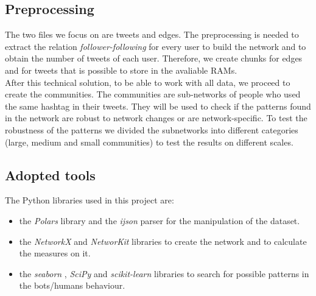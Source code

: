 \documentclass[12pt, a4paper]{article}
\begin{document}
    \subsection{Preprocessing}
    	The two files we focus on are tweets and edges. The preprocessing is needed to extract the relation \textit{follower-following} for every user to build the network and to obtain the number of tweets of each user.	 Therefore, we create chunks for edges and for tweets that is possible to store in the avaliable RAMs.\\
        After this technical solution, to be able to work with all data, we proceed to create the communities. The communities are sub-networks of people who used the same hashtag in their tweets. They will be used to check if the patterns found in the network are robust to network changes or are network-specific. To test the robustness of the patterns we divided the subnetworks into different categories (large, medium and small communities) to test the results on different scales.
	\subsection{Adopted tools}
		The Python libraries used in this project are:
        \begin{itemize}
            \item the \textit{Polars} library and the \textit{ijson} parser for the manipulation of the dataset.
            \item the \textit{NetworkX} \cite{hagberg2008} and \textit{NetworKit} \cite{staudt2016} libraries to create the network and to calculate the measures on it.
            \item the \textit{seaborn} \cite{seaborn2021}, \textit{SciPy} \cite{scipy2020} and \textit{scikit-learn} \cite{scikit-learn2011} libraries to search for possible patterns in the bots/humans behaviour.
        \end{itemize}
\end{document}
